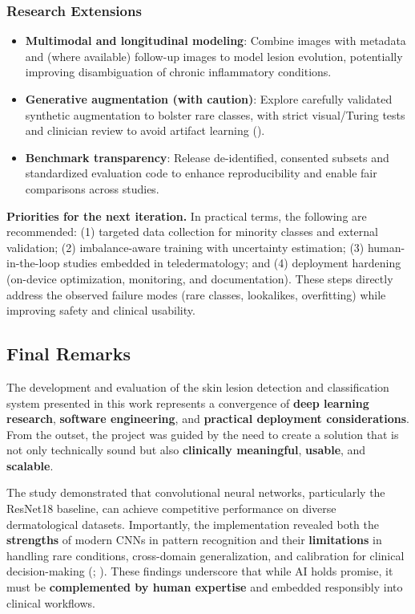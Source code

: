 \documentclass[
  12pt,
  oneside]{article}
\providecommand{\tightlist}{%
  \setlength{\itemsep}{0pt}\setlength{\parskip}{0pt}}
\begin{document}
\subsubsection{Research Extensions}\label{research-extensions}

\begin{itemize}
\tightlist
\item
  \textbf{Multimodal and longitudinal modeling}: Combine images with
  metadata and (where available) follow-up images to model lesion
  evolution, potentially improving disambiguation of chronic
  inflammatory conditions.
\item
  \textbf{Generative augmentation (with caution)}: Explore carefully
  validated synthetic augmentation to bolster rare classes, with strict
  visual/Turing tests and clinician review to avoid artifact learning
  ().
\item
  \textbf{Benchmark transparency}: Release de-identified, consented
  subsets and standardized evaluation code to enhance reproducibility
  and enable fair comparisons across studies.
\end{itemize}

\textbf{Priorities for the next iteration.} In practical terms, the
following are recommended: (1) targeted data collection for minority
classes and external validation; (2) imbalance-aware training with
uncertainty estimation; (3) human-in-the-loop studies embedded in
teledermatology; and (4) deployment hardening (on-device optimization,
monitoring, and documentation). These steps directly address the
observed failure modes (rare classes, lookalikes, overfitting) while
improving safety and clinical usability.

\subsection{Final Remarks}\label{final-remarks}

The development and evaluation of the skin lesion detection and
classification system presented in this work represents a convergence of
\textbf{deep learning research}, \textbf{software engineering}, and
\textbf{practical deployment considerations}. From the outset, the
project was guided by the need to create a solution that is not only
technically sound but also \textbf{clinically meaningful},
\textbf{usable}, and \textbf{scalable}.

The study demonstrated that convolutional neural networks, particularly
the ResNet18 baseline, can achieve competitive performance on diverse
dermatological datasets. Importantly, the implementation revealed both
the \textbf{strengths} of modern CNNs in pattern recognition and their
\textbf{limitations} in handling rare conditions, cross-domain
generalization, and calibration for clinical decision-making
(;
). These findings
underscore that while AI holds promise, it must be \textbf{complemented
by human expertise} and embedded responsibly into clinical workflows.
\end{document}
